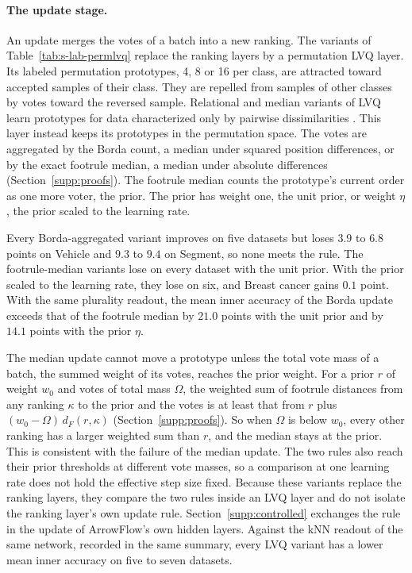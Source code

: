 \paragraph{The update stage.} An update merges the votes of a batch into a new ranking. The variants of Table~\ref{tab:s-lab-permlvq} replace the ranking layers by a permutation LVQ layer. Its labeled permutation prototypes, 4, 8 or 16 per class, are attracted toward accepted samples of their class. They are repelled from samples of other classes by votes toward the reversed sample. Relational and median variants of LVQ learn prototypes for data characterized only by pairwise dissimilarities \citep{hammer2014learning,nebel2015median}. This layer instead keeps its prototypes in the permutation space. The votes are aggregated by the Borda count, a median under squared position differences, or by the exact footrule median, a median under absolute differences (Section~\ref{supp:proofs}). The footrule median counts the prototype's current order as one more voter, the prior. The prior has weight one, the unit prior, or weight $\eta$, the prior scaled to the learning rate.

Every Borda-aggregated variant improves on five datasets but loses $3.9$ to $6.8$ points on Vehicle and $9.3$ to $9.4$ on Segment, so none meets the rule. The footrule-median variants lose on every dataset with the unit prior. With the prior scaled to the learning rate, they lose on six, and Breast cancer gains $0.1$ point. With the same plurality readout, the mean inner accuracy of the Borda update exceeds that of the footrule median by $21.0$ points with the unit prior and by $14.1$ points with the prior $\eta$.

The median update cannot move a prototype unless the total vote mass of a batch, the summed weight of its votes, reaches the prior weight. For a prior $r$ of weight $w_0$ and votes of total mass $\Omega$, the weighted sum of footrule distances from any ranking $\kappa$ to the prior and the votes is at least that from $r$ plus $(w_0-\Omega)\,d_F(r,\kappa)$ (Section~\ref{supp:proofs}). So when $\Omega$ is below $w_0$, every other ranking has a larger weighted sum than $r$, and the median stays at the prior. This is consistent with the failure of the median update. The two rules also reach their prior thresholds at different vote masses, so a comparison at one learning rate does not hold the effective step size fixed. Because these variants replace the ranking layers, they compare the two rules inside an LVQ layer and do not isolate the ranking layer's own update rule. Section~\ref{supp:controlled} exchanges the rule in the update of ArrowFlow's own hidden layers. Against the kNN readout of the same network, recorded in the same summary, every LVQ variant has a lower mean inner accuracy on five to seven datasets.

